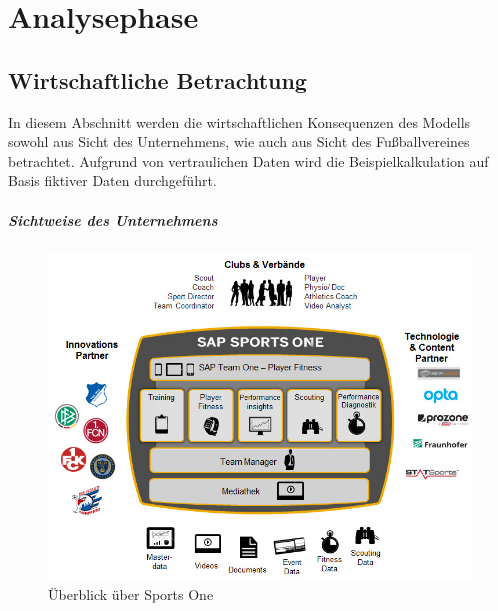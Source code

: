 \chapter{Analysephase}




\section{Wirtschaftliche Betrachtung}
\label{wa}
In diesem Abschnitt werden die wirtschaftlichen Konsequenzen des Modells sowohl aus Sicht des Unternehmens, wie auch aus Sicht des Fußballvereines betrachtet.\enlargethispage{2\baselineskip}  Aufgrund von vertraulichen Daten wird die Beispielkalkulation auf Basis fiktiver Daten durchgeführt.

\paragraph{Sichtweise des Unternehmens}

\begin{figure}[H]
\centering
\includegraphics[scale=0.575]{se-wa-jpg/sportsone}
\caption{Überblick über Sports One}
\label{sportsone}
\end{figure}

